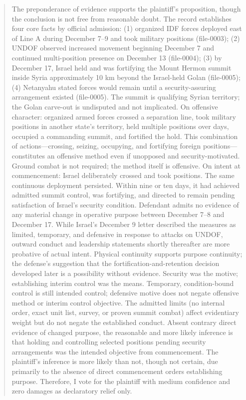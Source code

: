\begin{quote}
The preponderance of evidence supports the plaintiff's proposition, though the conclusion is not free from reasonable doubt. The record establishes four core facts by official admission: (1) organized IDF forces deployed east of Line A during December 7–9 and took military positions (file-0003); (2) UNDOF observed increased movement beginning December 7 and continued multi-position presence on December 13 (file-0004); (3) by December 17, Israel held and was fortifying the Mount Hermon summit inside Syria approximately 10 km beyond the Israel-held Golan (file-0005); (4) Netanyahu stated forces would remain until a security-assuring arrangement existed (file-0005). The summit is qualifying Syrian territory; the Golan carve-out is undisputed and not implicated. On offensive character: organized armed forces crossed a separation line, took military positions in another state's territory, held multiple positions over days, occupied a commanding summit, and fortified the hold. This combination of actions—crossing, seizing, occupying, and fortifying foreign positions—constitutes an offensive method even if unopposed and security-motivated. Ground combat is not required; the method itself is offensive. On intent at commencement: Israel deliberately crossed and took positions. The same continuous deployment persisted. Within nine or ten days, it had achieved admitted summit control, was fortifying, and directed to remain pending satisfaction of Israel's security condition. Defendant admits no evidence of any material change in operative purpose between December 7–8 and December 17. While Israel's December 9 letter described the measures as limited, temporary, and defensive in response to attacks on UNDOF, outward conduct and leadership statements shortly thereafter are more probative of actual intent. Physical continuity supports purpose continuity; the defense's suggestion that the fortification-and-retention decision developed later is a possibility without evidence. Security was the motive; establishing interim control was the means. Temporary, condition-bound control is still intended control; defensive motive does not negate offensive method or interim control objective. The admitted limits (no internal order, exact unit list, survey, or proven summit combat) affect evidentiary weight but do not negate the established conduct. Absent contrary direct evidence of changed purpose, the reasonable and more likely inference is that holding and controlling selected positions pending security arrangements was the intended objective from commencement. The plaintiff's inference is more likely than not, though not certain, due primarily to the absence of direct commencement orders establishing purpose. Therefore, I vote for the plaintiff with medium confidence and zero damages as declaratory relief only.
\end{quote}

